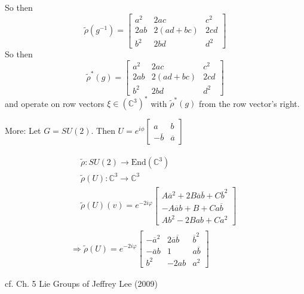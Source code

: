 \begin{enumerate}
	So then 
	\[
	\widetilde{\rho}(g^{-1}) = \left[ \begin{matrix} a^2 & 2ac & c^2 \\ 2ab & 2(ad+bc) & 2cd \\ b^2 & 2bd & d^2 \end{matrix} \right]
	\]
	So then 
	\[
	\widetilde{\rho}^*(g) = \left[ \begin{matrix} a^2 & 2ac & c^2 \\ 2ab & 2(ad+bc) & 2cd \\ b^2 & 2bd & d^2 \end{matrix} \right]
	\]
	and operate on row vectors $\xi \in (\mathbb{C}^3)^*$ with $\widetilde{\rho}^*(g)$ from the row vector's right.  
\end{enumerate}

More: Let $G = SU(2)$.  Then $U = e^{i\phi} \left[ \begin{matrix} a & b \\ -\overline{b} & \overline{a} \end{matrix} \right]$

\[
\begin{gathered}
\begin{aligned}
& \widetilde{\rho} : SU(2) \to \text{End}(\mathbb{C}^3) \\
& \widetilde{\rho}(U) : \mathbb{C}^3 \to \mathbb{C}^3 \\
& \widetilde{\rho}(U)(v) = e^{-2i\varphi} \left[ \begin{matrix} A\overline{a}^2 + 2B\overline{a}\overline{b} + C \overline{b}^2 \\ 
-A\overline{a}b + B + Ca\overline{b} \\
Ab^2 - 2Bab + Ca^2 \end{matrix} \right]
\end{aligned} \\
\Longrightarrow \widetilde{\rho}(U) = e^{-2i \varphi} \left[ \begin{matrix} -\overline{a}^2 & 2\overline{a}\overline{b} & \overline{b}^2 \\
-\overline{a}b & 1 & a\overline{b} \\
b^2 & - 2ab & a^2 \end{matrix} \right]
\end{gathered}
\]

cf. Ch. 5 Lie Groups of Jeffrey Lee (2009) \cite{dgdt:JLee2009}

